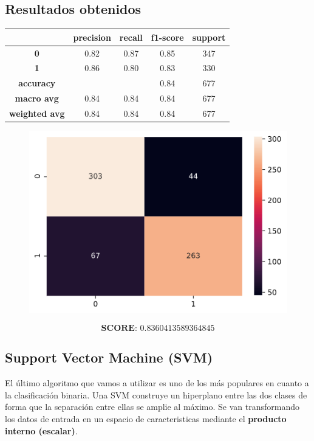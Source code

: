 \documentclass[11pt,a4paper]{article}
\begin{document}
\subsection*{Resultados obtenidos}
\begin{table}[H]
    \centering
    \begin{tabular}{c|cccc}
        \textbf{} & \textbf{precision} & \textbf{recall} & \textbf{f1-score} & \textbf{support} \\ \hline
        \textbf{0} & 0.82 & 0.87 & 0.85 & 347 \\
        \textbf{1} & 0.86 & 0.80 & 0.83 & 330 \\ \hline
        \textbf{accuracy} & & & 0.84 & 677 \\
        \textbf{macro avg} & 0.84 & 0.84 & 0.84 & 677 \\
        \textbf{weighted avg} & 0.84 & 0.84 & 0.84 & 677
    \end{tabular}
\end{table}

\begin{figure}[H]
    \centering
    \includegraphics[scale=0.5]{img/matrix-neuralnetwork.png}    
\end{figure}
$$\textbf{SCORE:  } 0.8360413589364845$$

\subsection{Support Vector Machine (SVM)}
El último algoritmo que vamos a utilizar es uno de los más populares en cuanto a la clasificación binaria. Una SVM construye
un hiperplano entre las dos clases de forma que la separación entre ellas se amplie al máximo. Se van transformando los datos
de entrada en un espacio de caracteristicas mediante el \textbf{producto interno (escalar)}.
\end{document}
